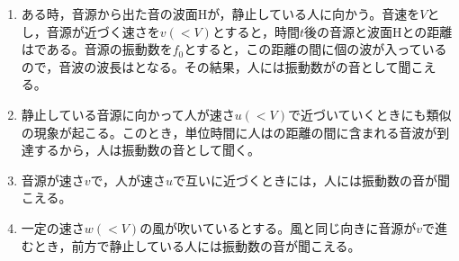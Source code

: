 \hakosyokika
\item
    \begin{enumerate}
        \item ある時，音源から出た音の波面Hが，静止している人に向かう。音速を$V$とし，音源が近づく速さを$v(<V)$とすると，時間$t$後の音源と波面Hとの距離は\Hako である。音源の振動数を$f_0$とすると，この距離の間に\Hako 個の波が入っているので，音波の波長は\Hako となる。その結果，人には振動数が\Hako の音として聞こえる。
        \item 静止している音源に向かって人が速さ$u(<V)$で近づいていくときにも類似の現象が起こる。このとき，単位時間に人は\Hako の距離の間に含まれる音波が到達するから，人は振動数\Hako の音として聞く。
        \item 音源が速さ$v$で，人が速さ$u$で互いに近づくときには，人には振動数\Hako の音が聞こえる。
        \item 一定の速さ$w(<V)$の風が吹いているとする。風と同じ向きに音源が$v$で進むとき，前方で静止している人には振動数\Hako の音が聞こえる。
    \end{enumerate}